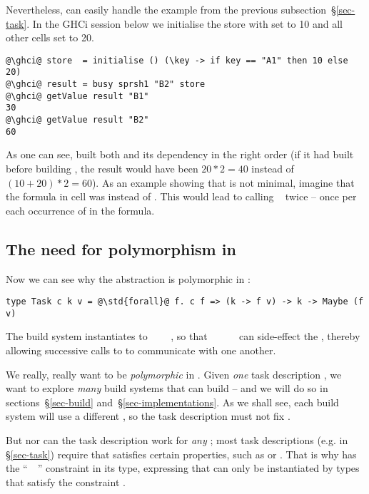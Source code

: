 Nevertheless,  can easily handle the example 
from the previous subsection~\S\ref{sec-task}. In the GHCi session below we
initialise the store with  set to 10 and all other cells set to 20.

\begin{verbatim}
@\ghci@ store  = initialise () (\key -> if key == "A1" then 10 else 20)
@\ghci@ result = busy sprsh1 "B2" store
@\ghci@ getValue result "B1"
30
@\ghci@ getValue result "B2"
60
\end{verbatim}

\noindent
As one can see,  built both  and its dependency  in the
right order (if it had built  before building , the result would
have been $20 * 2 = 40$ instead of $(10 + 20) * 2 = 60$). As an example showing
that  is not minimal, imagine that the formula in cell  was
 instead of . This would lead to calling
~ twice -- once per each occurrence of  in the
formula.

\subsection{The need for polymorphism in }\label{sec-why-polymorphism}

Now we can see why the  abstraction is polymorphic in :
\begin{verbatim}
type Task c k v = @\std{forall}@ f. c f => (k -> f v) -> k -> Maybe (f v)
\end{verbatim}
The  build system instantiates  to
~~~~,
so that ~\hs{::}~~\hs{->}~~ can side-effect the
, thereby allowing successive calls to  to communicate with
one another.

We really, really want  to be \emph{polymorphic} in .
Given \emph{one} task description , we want to explore \emph{many} build
systems that can build  -- and we will do so in sections~\S\ref{sec-build}
and~\S\ref{sec-implementations}. As we shall see, each build system will use a
different , so the task description must not fix .

But nor can the task description work for \emph{any} ; most task
descriptions (e.g.  in \S\ref{sec-task}) require that 
satisfies certain properties, such as  or . That is
why  has the ``~~\hs{=>}'' constraint in its type,
expressing that  can only be instantiated by types that satisfy the
constraint .


